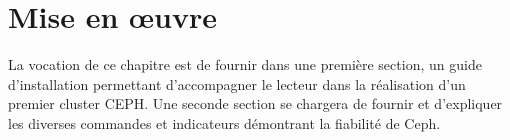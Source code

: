 \chapter{Mise en œuvre}

La vocation de ce chapitre est de fournir dans une première section, un guide d'installation permettant d'accompagner le lecteur dans la réalisation d'un premier cluster CEPH. Une seconde section se chargera de fournir et d'expliquer les diverses commandes et indicateurs démontrant la fiabilité de Ceph.


\newpage
